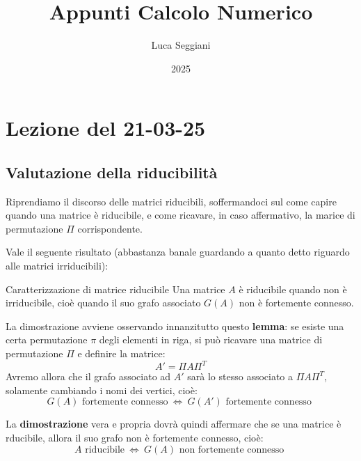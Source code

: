 \documentclass[a4paper,11pt]{article}
\title{Appunti Calcolo Numerico}
\author{Luca Seggiani}
\date{2025}
\begin{document}
\section{Lezione del 21-03-25}

\thispagestyle{empty}
\pagestyle{fancy}

\lstset{style=codestyle, language=matlab}

\subsection{Valutazione della riducibilità}
Riprendiamo il discorso delle matrici riducibili, soffermandoci sul come capire quando una matrice è riducibile, e come ricavare, in caso affermativo, la marice di permutazione $\Pi$ corrispondente.

Vale il seguente risultato (abbastanza banale guardando a quanto detto riguardo alle matrici irriducibili):
\begin{theorem}{Caratterizzazione di matrice riducibile}
	Una matrice $A$ è riducibile quando non è irriducibile, cioè quando il suo grafo associato $G(A)$ non è fortemente connesso.
\end{theorem}

La dimostrazione avviene osservando innanzitutto questo \textbf{lemma}: se esiste una certa permutazione $\pi$ degli elementi in riga, si può ricavare una matrice di permutazione $\Pi$ e definire la matrice:
$$
A' = \Pi A \Pi^T
$$
Avremo allora che il grafo associato ad $A'$ sarà lo stesso associato a $\Pi A \Pi^T$, solamente cambiando i nomi dei vertici, cioè:
$$
G(A) \text{ fortemente connesso} \ \Leftrightarrow \  G(A') \text{ fortemente connesso }
$$

La \textbf{dimostrazione} vera e propria dovrà quindi affermare che se una matrice è rducibile, allora il suo grafo non è fortemente connesso, cioè:
$$
A \text{ riducibile} \ \Leftrightarrow \  G(A) \text{ non fortemente connesso }
$$
\end{document}
